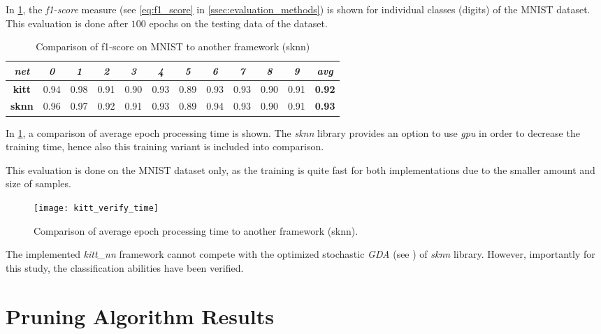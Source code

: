 In \cref{tab:kitt_verify_f1}, the \textit{f1-score} measure (see \cref{eq:f1_score} in \cref{ssec:evaluation_methods}) is shown for individual classes (digits) of the MNIST dataset. This evaluation is done after $ 100 $ epochs on the testing data of the dataset.

\begin{table}[H]
\centering
\caption{Comparison of f1-score on MNIST to another framework (sknn)}
\label{tab:kitt_verify_f1}
\resizebox{\textwidth}{!} {
\begin{tabular}{|c|c|c|c|c|c|c|c|c|c|c|c|}
\hline
\textit{net}  & \textit{0} & \textit{1} & \textit{2} & \textit{3} & \textit{4} & \textit{5} & \textit{6} & \textit{7} & \textit{8} & \textit{9} & \textit{avg}  \\ \hline
\textbf{kitt} & 0.94       & 0.98       & 0.91       & 0.90       & 0.93       & 0.89       & 0.93       & 0.93       & 0.90       & 0.91       & \textbf{0.92} \\ \hline
\textbf{sknn} & 0.96       & 0.97       & 0.92       & 0.91       & 0.93       & 0.89       & 0.94       & 0.93       & 0.90       & 0.91       & \textbf{0.93} \\ \hline
\end{tabular}
}
\end{table}

In \cref{fig:kitt_verify_time}, a comparison of average epoch processing time is shown. The \textit{sknn} library provides an option to use \textit{gpu} in order to decrease the training time, hence also this training variant is included into comparison.

This evaluation is done on the MNIST dataset only, as the training is quite fast for both implementations due to the smaller amount and size of samples.

\begin{figure}[H]
  \centering
  \texttt{[image: kitt\_verify\_time]}
  \caption{Comparison of average epoch processing time to another framework (sknn).}
  \label{fig:kitt_verify_time}
\end{figure}

The implemented \textit{kitt\_nn} framework cannot compete with the optimized stochastic \textit{GDA} (see \citep{misc:sknn}) of \textit{sknn} library. However, importantly for this study, the classification abilities have been verified.

\section{Pruning Algorithm Results} \label{sec:pruning_algorithm_results}


